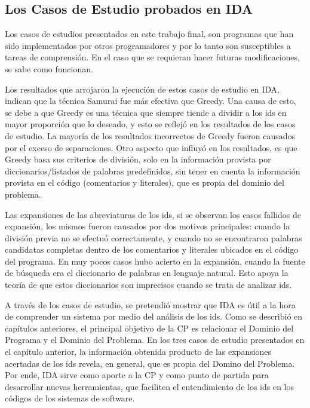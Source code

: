 \subsection{Los Casos de Estudio probados en IDA}

Los casos de estudios presentados en este trabajo final, son programas que han sido implementados por otros programadores y por lo tanto son susceptibles a tareas de comprensión. En el caso que se requieran hacer futuras modificaciones, se sabe como funcionan.

Los resultados que arrojaron la ejecución de estos casos de estudio en IDA, indican que la técnica Samurai fue más efectiva que Greedy. Una causa de esto, se debe a que Greedy es una técnica que siempre tiende a dividir a los ids en mayor proporción que lo deseado, y esto se reflejó en los resultados de los casos de estudio. La mayoría de los resultados incorrectos de Greedy fueron causados por el exceso de separaciones. Otro aspecto que influyó en los resultados, es que Greedy basa sus criterios de división, solo en la información provista por diccionarios/listados de palabras predefinidos, sin tener en cuenta la información provista en el código (comentarios y literales), que es propia del dominio del problema.

Las expansiones de las abreviaturas de los ids, si se observan los casos fallidos de expansión, los mismos fueron causados por dos motivos principales: cuando la división previa no se efectuó correctamente, y cuando no se encontraron palabras candidatas completas dentro de los comentarios y literales ubicados en el código del programa. En muy pocos casos hubo acierto en la expansión, cuando la fuente de búsqueda era el diccionario de palabras en lenguaje natural. Esto apoya la teoría de que estos diccionarios son imprecisos cuando se trata de analizar ids.

A través de los casos de estudio, se pretendió mostrar que IDA es útil a la hora de comprender un sistema por medio del análisis de los ids. Como se describió en capítulos anteriores, el principal objetivo de la CP es relacionar el Dominio del Programa y el Dominio del Problema. En los tres casos de estudio presentados en el capítulo anterior, la información obtenida producto de las expansiones acertadas de los ids revela, en general, que es propia del Domino del Problema. Por ende, IDA sirve como aporte a la CP y como punto de partida para desarrollar nuevas herramientas, que faciliten el entendimiento de los ids en los códigos de los sistemas de software.


